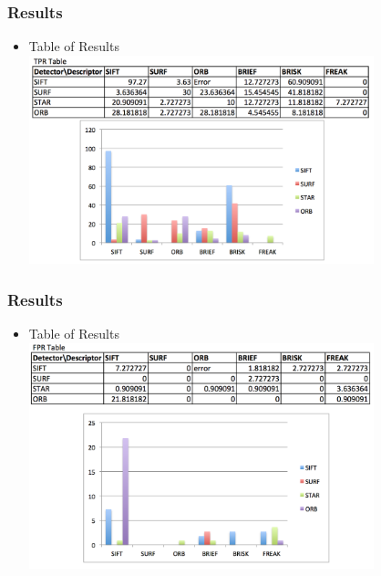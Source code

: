 \documentclass{beamer}
\begin{document}
    \begin{frame}
        \frametitle{Results}
        \begin{itemize}[<+->]
            \item Table of Results
            \includegraphics[width=10cm]{results_tpr}
        \end{itemize}
    \end{frame}
    
    \begin{frame}
        \frametitle{Results}
        \begin{itemize}[<+->]
            \item Table of Results
            \includegraphics[width=10cm]{results_fpr}
        \end{itemize}
    \end{frame}
    
\end{document}
